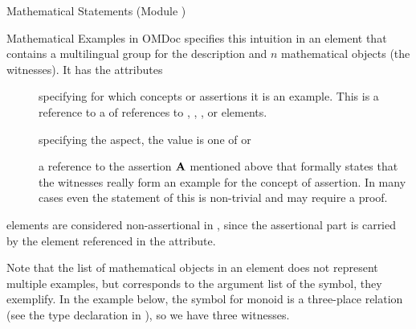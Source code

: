 \begin{tchapter}[id=statements,short=Mathematical Statements]{Mathematical Statements (Module {})}
\begin{tsection}[id=examples]{Mathematical Examples in OMDoc}
  {\omdoc} specifies this intuition in an {} element that contains a
  multilingual {} group for the description and $n$
  mathematical objects (the witnesses). It has the attributes
\begin{description}
\item[{}] specifying for which concepts or assertions
    it is an example.  This is a reference to a {} of {} references to {},
    {}, , or {} elements.
\item[{}] specifying the aspect, the value is one of
  {} or {}
\item[{}] a reference to the assertion ${\bf A}$
  mentioned above that formally states that the witnesses really form an example for the
  concept of assertion. In many cases even the statement of this is non-trivial
  and may require a proof.
\end{description}

{} elements are considered non-assertional in
{\omdoc}, since the assertional part is carried by the {} element
referenced in the {} attribute.

Note that the list of mathematical objects in an {} element does not
represent multiple examples, but corresponds to the argument list of the symbol, they
exemplify. In the example below, the symbol for monoid is a three-place relation (see the
type declaration in {}), so we have three witnesses.


\end{tsection}
\end{tchapter}
